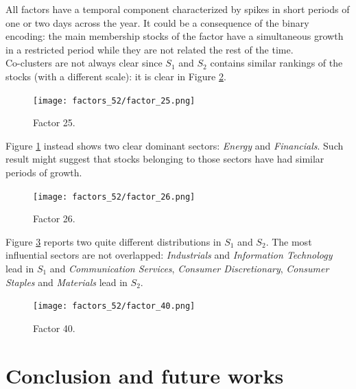 \documentclass[12pt]{extarticle}
\begin{document}
All factors have a temporal component characterized by spikes in short periods of one or two days across the year. It could be a consequence of the binary encoding: the main membership stocks of the factor have a simultaneous growth in a restricted period while they are not related the rest of the time.\\
Co-clusters are not always clear since $S_1$ and $S_2$ contains similar rankings of the stocks (with a different scale): it is clear in Figure \ref{fig:f26}.

\begin{figure}[!h]
	\centering
	\texttt{[image: factors\_52/factor\_25.png]}
	\caption{Factor 25.} 
	\label{fig:f25}
\end{figure}

Figure \ref{fig:f25} instead shows two clear dominant sectors: \textit{Energy} and \textit{Financials}. Such result might suggest that stocks belonging to those sectors have had similar periods of growth. 

\begin{figure}[!h]
	\centering
	\texttt{[image: factors\_52/factor\_26.png]}
	\caption{Factor 26.} 
	\label{fig:f26}
\end{figure}

Figure \ref{fig:f40} reports two quite different distributions in $S_1$ and $S_2$. The most influential sectors are not overlapped: \textit{Industrials} and \textit{Information Technology} lead in $S_1$ and \textit{Communication Services}, \textit{Consumer Discretionary}, \textit{Consumer Staples} and \textit{Materials} lead in $S_2$.

\begin{figure}[!h]
	\centering
	\texttt{[image: factors\_52/factor\_40.png]}
	\caption{Factor 40.} 
	\label{fig:f40}
\end{figure}

\section{Conclusion and future works}
\end{document}
